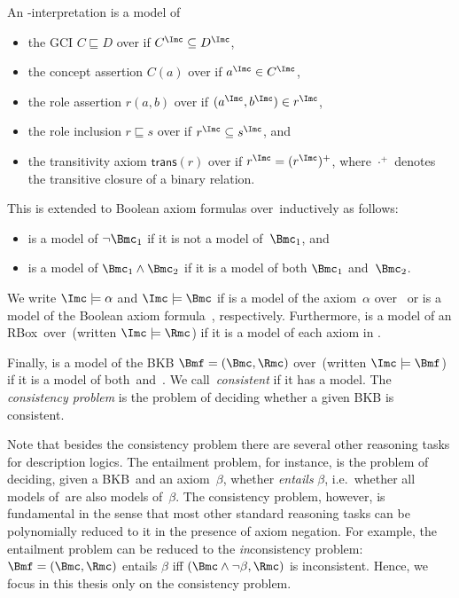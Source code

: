 \begin{definition}
  \label{def:semantics-of-axioms}
  An \Nsig-interpretation \I is a model of
  \begin{itemize}
  \item the GCI $C \sqsubseteq D$ over \Nsig if $C^{\I} \subseteq D^{\I}$,
  \item the concept assertion $C(a)$ over \Nsig if $a^{\I} \in C^{\I}$,
  \item the role assertion $r(a,b)$ over \Nsig if $(a^\I,b^\I)\in r^\I$,
  \item the role inclusion $r \sqsubseteq s$ over \Nsig if $r^\I \subseteq s^\I$, and
  \item the transitivity axiom $\mathsf{trans}(r)$ over \Nsig if $r^\I=(r^\I)^+$, where $\cdot^{+}$
    denotes the transitive closure of a binary relation.
  \end{itemize}
  This is extended to Boolean axiom formulas over~\Nsig inductively as follows:
  \begin{itemize}
  \item \I is a model of $\lnot\B_1$ if it is not a model of~$\B_1$, and
  \item \I is a model of $\B_1\land\B_2$ if it is a model of both $\B_1$ and~$\B_2$.
  \end{itemize}
  We write $\I\models\alpha$ and $\I\models\Bmc$ if \I is a model of the axiom~$\alpha$ over~\Nsig
  or \I is a model of the Boolean axiom formula~\B, respectively. Furthermore, \I is a model of an
  RBox~\Rmc over~\Nsig (written $\I\models\Rmc$) if it is a model of each axiom in \Rmc.

  Finally, \I is a model of the BKB $\Bmf=(\B,\Rmc)$ over~\Nsig (written $\I\models\Bmf$) if it is a
  model of both~\B and~\Rmc.  We call~\Bmf \emph{consistent} if it has a model.  The
  \emph{consistency problem} is the problem of deciding whether a given BKB is consistent.
\end{definition}

\noindent
Note that besides the consistency problem there are several other reasoning tasks for description
logics.  The entailment problem, for instance, is the problem of deciding, given a BKB~\Bmf and an
axiom~$\beta$, whether \Bmf \emph{entails} $\beta$, i.e.~whether all models of~\Bmf are also models
of~$\beta$.
%
The consistency problem, however, is fundamental in the sense that most other standard reasoning tasks can be polynomially reduced to it in the presence of axiom negation.
For example, the entailment problem can be reduced to the \emph{in}consistency problem: $\Bmf=(\B,\Rmc)$
entails $\beta$ iff $(\B\land\lnot\beta,\Rmc)$ is inconsistent.  Hence, we focus in this thesis only
on the consistency problem.

